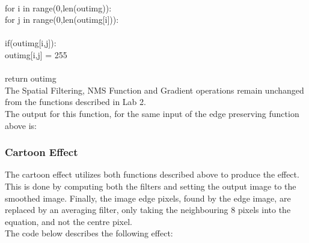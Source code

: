\documentclass{article}
\begin{document}
	\\
	\indent for i in range(0,len(out\textunderscore img)):\\
	\indent \indent for j in range(0,len(out\textunderscore img[i])):\\
	\\
	\indent \indent \indent if(out\textunderscore img[i,j]):\\
	\indent \indent \indent \indent out\textunderscore img[i,j] = 255\\
	\\
	\indent return out\textunderscore img\\
	
	The Spatial Filtering, NMS Function and Gradient operations remain unchanged from the functions described in Lab 2.\\
	
	The output for this function, for the same input of the edge preserving function above is:\\

	\subsubsection{Cartoon Effect}

	The cartoon effect utilizes both functions described above to produce the effect. This is done by computing both the filters and setting the output image to the smoothed image. Finally, the image edge pixels, found by the edge image, are replaced by an averaging filter, only taking the neighbouring 8 pixels into the equation, and not the centre pixel.\\
	
	The code below describes the following effect:\\
	
\end{document}
